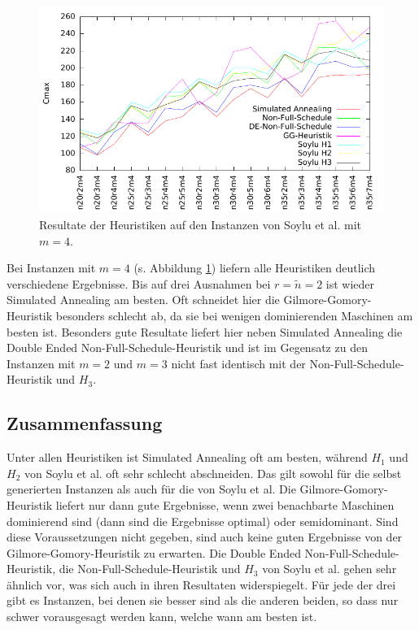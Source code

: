 \documentclass{scrreprt}
\begin{document}
\begin{figure}
    \begin{center}
        \includegraphics[width=.8\textwidth]{../instances/soylu/plotm4.pdf}
    \end{center}
    \caption{
        \label{abb:soylutest4}
        Resultate der Heuristiken auf den Instanzen von Soylu et al. mit $m=4$.
    }
\end{figure}
Bei Instanzen mit $m=4$ (s. Abbildung \ref{abb:soylutest4}) liefern alle Heuristiken deutlich verschiedene Ergebnisse.
Bis auf drei Ausnahmen bei $r=\tilde{n}=2$ ist wieder Simulated Annealing am besten.
Oft schneidet hier die Gilmore-Gomory-Heuristik besonders schlecht ab, da sie bei wenigen dominierenden Maschinen am besten ist.
Besonders gute Resultate liefert hier neben Simulated Annealing die Double Ended Non-Full-Schedule-Heuristik und ist im Gegensatz zu den Instanzen mit $m=2$ und $m=3$ nicht 
fast identisch mit der Non-Full-Schedule-Heuristik und $H_3$.

\subsection{Zusammenfassung}
Unter allen Heuristiken ist Simulated Annealing oft am besten, während $H_1$ und $H_2$ von Soylu et al. oft sehr schlecht abschneiden.
Das gilt sowohl für die selbst generierten Instanzen als auch für die von Soylu et al.
Die Gilmore-Gomory-Heuristik liefert nur dann gute Ergebnisse, wenn zwei benachbarte Maschinen dominierend sind (dann sind die Ergebnisse optimal)
oder semidominant. Sind diese Voraussetzungen nicht gegeben, sind auch keine guten Ergebnisse von der Gilmore-Gomory-Heuristik zu erwarten.
Die Double Ended Non-Full-Schedule-Heuristik, die Non-Full-Schedule-Heuristik und $H_3$ von Soylu et al. gehen sehr ähnlich vor, 
was sich auch in ihren Resultaten widerspiegelt.
Für jede der drei gibt es Instanzen, bei denen sie besser sind als die anderen beiden, so dass nur schwer vorausgesagt werden kann, welche wann am besten ist.
\end{document}
